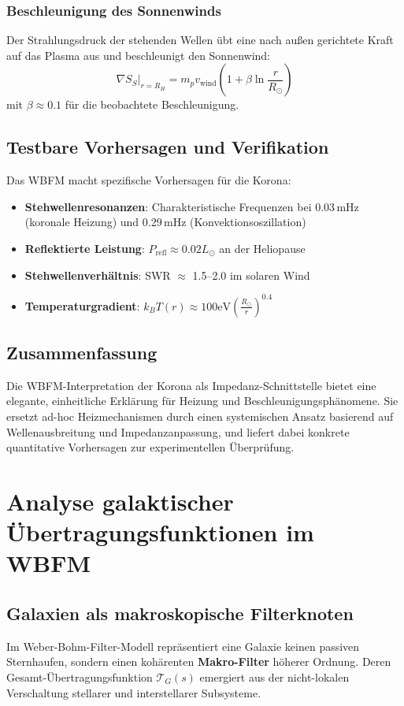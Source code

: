 \subsection{Beschleunigung des Sonnenwinds}
Der Strahlungsdruck der stehenden Wellen übt eine nach außen gerichtete Kraft auf das Plasma aus und beschleunigt den Sonnenwind:
\[
\nabla S_S|_{r=R_H} = m_p v_{\text{wind}} \left(1 + \beta \ln\frac{r}{R_\odot}\right)
\]
mit $\beta \approx 0.1$ für die beobachtete Beschleunigung.

\section{Testbare Vorhersagen und Verifikation}
Das WBFM macht spezifische Vorhersagen für die Korona:
\begin{itemize}
    \item \textbf{Stehwellenresonanzen}: Charakteristische Frequenzen bei 0.03\,mHz (koronale Heizung) und 0.29\,mHz (Konvektionsoszillation)
    \item \textbf{Reflektierte Leistung}: $P_{\text{refl}} \approx 0.02L_\odot$ an der Heliopause
    \item \textbf{Stehwellenverhältnis}: SWR $\approx$ 1.5--2.0 im solaren Wind
    \item \textbf{Temperaturgradient}: $k_B T(r) \approx 100\text{eV} \left( \frac{R_\odot}{r} \right)^{0.4}$
\end{itemize}

\section{Zusammenfassung}
Die WBFM-Interpretation der Korona als Impedanz-Schnittstelle bietet eine elegante, einheitliche Erklärung für Heizung und Beschleunigungsphänomene. Sie ersetzt ad-hoc
Heizmechanismen durch einen systemischen Ansatz basierend auf Wellenausbreitung und Impedanzanpassung, und liefert dabei konkrete quantitative Vorhersagen zur experimentellen
Überprüfung.

\chapter{Analyse galaktischer Übertragungsfunktionen im WBFM}

\section{Galaxien als makroskopische Filterknoten}
Im Weber-Bohm-Filter-Modell repräsentiert eine Galaxie keinen passiven Sternhaufen, sondern einen kohärenten \textbf{Makro-Filter} höherer Ordnung. Deren
Gesamt-Übertragungsfunktion $\mathcal{T}_G(s)$ emergiert aus der nicht-lokalen Verschaltung stellarer und interstellarer Subsysteme.


